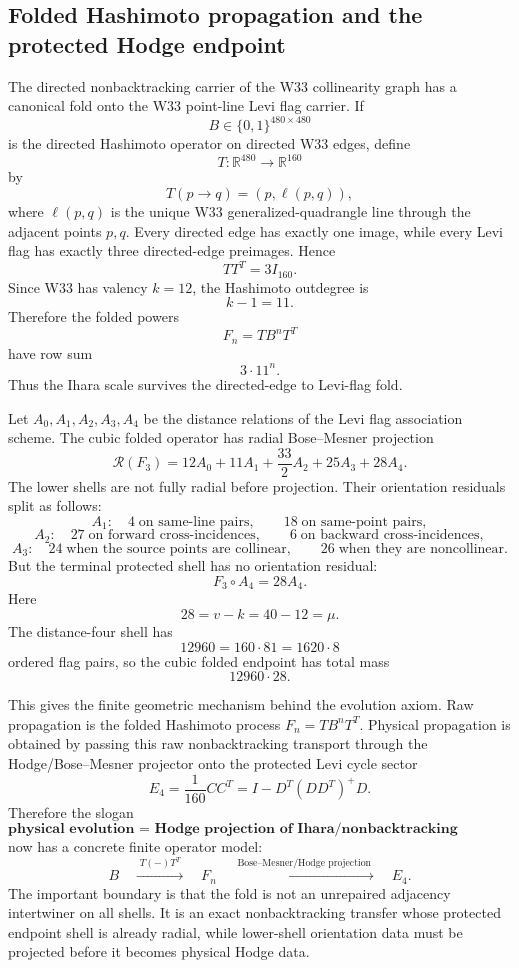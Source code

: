 
\subsection{Folded Hashimoto propagation and the protected Hodge endpoint}\label{subsec:folded-hashimoto-hodge-flow}

The directed nonbacktracking carrier of the W33 collinearity graph has a canonical fold onto the W33 point-line Levi flag carrier.  If
\[
B\in\{0,1\}^{480\times480}
\]
is the directed Hashimoto operator on directed W33 edges, define
\[
T:\mathbb R^{480}\longrightarrow \mathbb R^{160}
\]
by
\[
\boxed{
T(p\to q)=(p,\ell(p,q)),
}
\]
where \(\ell(p,q)\) is the unique W33 generalized-quadrangle line through the adjacent points \(p,q\).  Every directed edge has exactly one image, while every Levi flag has exactly three directed-edge preimages.  Hence
\[
\boxed{
TT^T=3I_{160}.
}
\]
Since W33 has valency \(k=12\), the Hashimoto outdegree is
\[
\boxed{
k-1=11.
}
\]
Therefore the folded powers
\[
\boxed{
F_n=TB^nT^T
}
\]
have row sum
\[
\boxed{
3\cdot 11^n.
}
\]
Thus the Ihara scale survives the directed-edge to Levi-flag fold.

Let \(A_0,A_1,A_2,A_3,A_4\) be the distance relations of the Levi flag association scheme.  The cubic folded operator has radial Bose--Mesner projection
\[
\boxed{
\mathcal R(F_3)
=
12A_0+11A_1+\frac{33}{2}A_2+25A_3+28A_4.
}
\]
The lower shells are not fully radial before projection.  Their orientation residuals split as follows:
\[
A_1:\quad 4\;\text{on same-line pairs},\qquad 18\;\text{on same-point pairs},
\]
\[
A_2:\quad 27\;\text{on forward cross-incidences},\qquad 6\;\text{on backward cross-incidences},
\]
\[
A_3:\quad 24\;\text{when the source points are collinear},\qquad 26\;\text{when they are noncollinear}.
\]
But the terminal protected shell has no orientation residual:
\[
\boxed{
F_3\circ A_4=28A_4.
}
\]
Here
\[
\boxed{
28=v-k=40-12=\mu.
}
\]
The distance-four shell has
\[
\boxed{
12960=160\cdot81=1620\cdot8
}
\]
ordered flag pairs, so the cubic folded endpoint has total mass
\[
\boxed{
12960\cdot 28.
}
\]

This gives the finite geometric mechanism behind the evolution axiom.  Raw propagation is the folded Hashimoto process \(F_n=TB^nT^T\).  Physical propagation is obtained by passing this raw nonbacktracking transport through the Hodge/Bose--Mesner projector onto the protected Levi cycle sector
\[
\boxed{
E_4=\frac1{160}CC^T
=I-D^T(DD^T)^+D.
}
\]
Therefore the slogan
\[
\boxed{
\textbf{physical evolution = Hodge projection of Ihara/nonbacktracking propagation}
}
\]
now has a concrete finite operator model:
\[
\boxed{
B\quad\xrightarrow{\;T(-)T^T\;}\quad F_n\quad\xrightarrow{\;\text{Bose--Mesner/Hodge projection}\;}\quad E_4.
}
\]
The important boundary is that the fold is not an unrepaired adjacency intertwiner on all shells.  It is an exact nonbacktracking transfer whose protected endpoint shell is already radial, while lower-shell orientation data must be projected before it becomes physical Hodge data.
